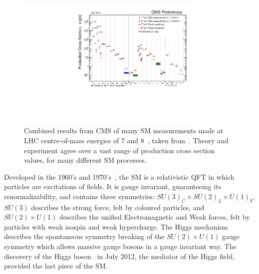 \begin{figure}[htbp]
  \begin{center}
  \includegraphics[width=0.8\textwidth]{Figures/theory/SigmaNew_v0}
  \caption{Combined results from \ac{CMS} of many \ac{SM} measurements made at \ac{LHC} centre-of-mass energies of 7 and 8~\TeV, taken from~\cite{CMSpublictwiki}. Theory and experiment agree over a vast range of production cross section values, for many different \ac{SM} processes.
}
  \label{fig:stairwayToHeaven}
  \end{center}
\end{figure}

Developed in the 1960's and 1970's~\cite{PhysRevLett.19.1264,Glashow:1961tr,Salam:1968rm,Hooft1971167}, the \ac{SM} is a relativistic \ac{QFT} in which particles are excitations of fields. 
It is gauge invariant, guaranteeing its renormalizability, and contains three symmetries:
$SU(3)_{C} \times SU(2)_{L} \times U(1)_{Y}$.
$SU(3)$ describes the strong force, felt by coloured particles, 
and $SU(2) \times U(1)$ describes the unified Electromagnetic and Weak forces, felt by particles with weak isospin and weak hypercharge. 
The Higgs mechanism~\cite{PhysRevLett.13.508} describes the spontaneous symmetry breaking of the $SU(2) \times U(1)$ gauge symmetry which allows massive gauge bosons in a gauge invariant way.
The discovery of the Higgs boson~\cite{Aad:2012tfa,Chatrchyan:2012ufa} in July 2012, the mediator of the Higgs field, provided the last piece of the \ac{SM}. 


